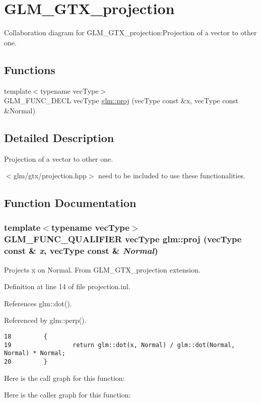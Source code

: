 \hypertarget{group__gtx__projection}{
\section{GLM\_\-GTX\_\-projection}
\label{group__gtx__projection}
}


Collaboration diagram for GLM\_\-GTX\_\-projection:Projection of a vector to other one.  
\subsection*{Functions}
\begin{CompactItemize}
\item 
{\footnotesize template$<$typename vecType$>$ }\\GLM\_\-FUNC\_\-DECL vecType \hyperlink{group__gtx__projection_g2a2ab28abbc6fa33c226ea8dd9ccd8cd}{glm::proj} (vecType const \&x, vecType const \&Normal)
\end{CompactItemize}


\subsection{Detailed Description}
Projection of a vector to other one. 

$<$glm/gtx/projection.hpp$>$ need to be included to use these functionalities. 

\subsection{Function Documentation}
\hypertarget{group__gtx__projection_g2a2ab28abbc6fa33c226ea8dd9ccd8cd}{
\subsubsection[proj]{\setlength{\rightskip}{0pt plus 5cm}template$<$typename vecType$>$ GLM\_\-FUNC\_\-QUALIFIER vecType glm::proj (vecType const \& {\em x}, \/  vecType const \& {\em Normal})}}
\label{group__gtx__projection_g2a2ab28abbc6fa33c226ea8dd9ccd8cd}


Projects x on Normal. From GLM\_\-GTX\_\-projection extension. 

Definition at line 14 of file projection.inl.

References glm::dot().

Referenced by glm::perp().

\begin{Code}\begin{verbatim}18         {
19                 return glm::dot(x, Normal) / glm::dot(Normal, Normal) * Normal;
20         }
\end{verbatim}
\end{Code}




Here is the call graph for this function:

Here is the caller graph for this function: